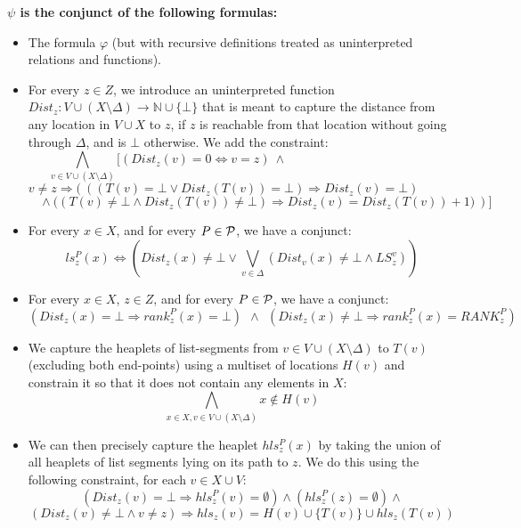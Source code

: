 \medskip
\noindent 
{\bf $\psi$ is the conjunct of the following formulas:}
\begin{itemize}
	\item The formula $\varphi$ (but with recursive definitions treated as uninterpreted relations and functions).
	\item For every $z \in Z$, we introduce an uninterpreted function $Dist_z: V \cup (X \setminus \Delta) \longrightarrow \mathbb{N} \cup \{\bot\}$ that
             is meant to capture the distance from any location in $V \cup X$ to $z$, if $z$ is reachable from
               that location without going through $\Delta$, and is $\bot$ otherwise. We add the constraint:
          $$\bigwedge_{v \in V\cup (X\setminus \Delta)} \big[ (Dist_z(v)\!=\!0 \Leftrightarrow v=z) ~\wedge ~~~~~~~~~~~~~~~~~~~~~~~~~~~~~~~~~~~~~~~~~~~~~~~~~~~~~~$$
          $$ v \!\not =\! z \Rightarrow \big(~\left( (T(v)\!=\!\bot \vee Dist_z(T(v))\!=\!\bot) \Rightarrow Dist_z(v) \!=\! \bot
                 \right)~~~~~~~~~~~~~~~$$
          $$  ~~~~~  \left. \wedge ~((T(v) \not = \bot \wedge Dist_z(T(v)) \not = \bot) \Rightarrow Dist_z(v) = Dist_z(T(v))+1
                \big) ~\right)\big] $$
              
	\item For every $x \in X$, and for every $P \in {\cal P}$, we have a conjunct:
		     $$ls_z^P(x) \Leftrightarrow (Dist_z(x)\not= \bot \vee \bigvee_{v \in \Delta} (Dist_v(x) \not = \bot
		       \wedge LS_z^v))$$
		     
    \item For every $x \in X$, $z \in Z$, and for every $P \in {\cal P}$, we have a conjunct:
             $$ \left( Dist_z(x) \!=\! \bot \Rightarrow rank_z^P\!(x)\!=\!\bot\right) ~~\wedge~~ 
               \left( Dist_z(x) \!\not =\! \bot \Rightarrow rank_z^P\!(x)\!=\!RANK_z^P \right)$$
               
    \item We capture the heaplets of list-segments from $v \in V \cup (X \setminus \Delta)$ to $T(v)$ (excluding both
              end-points) using a multiset
             of locations $H(v)$
             and constrain it so that it does not contain any elements in $X$:
             $$ \bigwedge_{x \in X, v \in V \cup (X \setminus \Delta)} x \not \in H(v)$$  
    
    \item We can then precisely capture the heaplet $hls_z^P(x)$ by taking the union of all heaplets of
           list segments lying on its path to $z$. We do this using the following constraint, for each
           $v \in X \cup V$:
           $$(Dist_z(v)=\bot \Rightarrow hls_z^P (v) = \emptyset) \wedge (hls_z^P(z)= \emptyset)\wedge $$
           $$(Dist_z(v) \not = \bot \wedge v \not = z) \Rightarrow hls_z(v)= H(v) \cup \{T(v)\} \cup hls_z(T(v))$$

\end{itemize}

